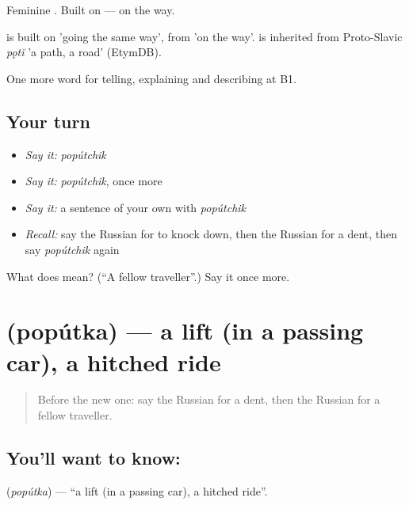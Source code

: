 Feminine \emph{}. Built on \emph{ } — on the way.

\begin{cousinweb}
\emph{} is built on \emph{} 'going the same way', from \emph{ } 'on the way'. \emph{} is inherited from Proto-Slavic \emph{pǫtĭ} 'a path, a road' (EtymDB).
\end{cousinweb}

\begin{grammarlens}[title={What you've built}]
One more word for telling, explaining and describing at B1.
\end{grammarlens}

\subsection*{Your turn}
\begin{itemize}
\raggedright
  \item \emph{Say it:} \emph{popútchik}
  \item \emph{Say it:} \emph{popútchik}, once more
  \item \emph{Say it:} a sentence of your own with \emph{popútchik}
  \item \emph{Recall:} say the Russian for to knock down, then the Russian for a dent, then say \emph{popútchik} again
\end{itemize}

\begin{tcolorbox}[breakable,colback=teal!4,colframe=teal!35!black,title={Before you move on}]
What does  mean? (\textquotedblleft{}A fellow traveller\textquotedblright{}.) Say it once more.
\end{tcolorbox}
\section[\texorpdfstring{\ru{попутка} (popútka)}{попутка (popútka)}]{ (popútka) — a lift (in a passing car), a hitched ride}

\label{lesson:RU-C411-poputka}



\begin{quote}
Before the new one: say the Russian for a dent, then the Russian for a fellow traveller.
\end{quote}

\subsection*{You'll want to know: }
\textbf{} (\emph{popútka}) — \textquotedblleft{}a lift (in a passing car), a hitched ride\textquotedblright{}.

